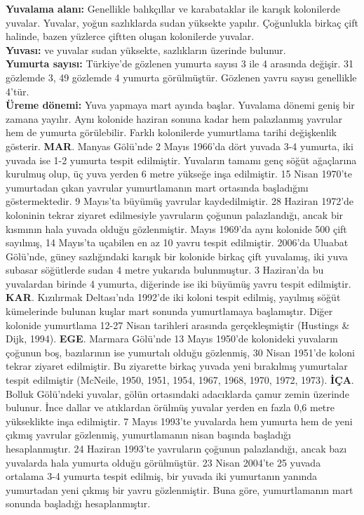 \documentclass[
  a4paper,
  DIV=11,
  numbers=noendperiod]{scrreprt}
\begin{document}
\textbf{Yuvalama alanı:} Genellikle balıkçıllar ve karabataklar ile
karışık kolonilerde yuvalar. Yuvalar, yoğun sazlıklarda sudan yüksekte
yapılır. Çoğunlukla birkaç çift halinde, bazen yüzlerce çiftten oluşan
kolonilerde yuvalar.\\
\textbf{Yuvası:} ve yuvalar sudan yüksekte, sazlıkların üzerinde
bulunur.\\
\textbf{Yumurta sayısı:} Türkiye'de gözlenen yumurta sayısı 3 ile 4
arasında değişir. 31 gözlemde 3, 49 gözlemde 4 yumurta görülmüştür.
Gözlenen yavru sayısı genellikle 4'tür.\\
\textbf{Üreme dönemi:} Yuva yapmaya mart ayında başlar. Yuvalama dönemi
geniş bir zamana yayılır. Aynı kolonide haziran sonuna kadar hem
palazlanmış yavrular hem de yumurta görülebilir. Farklı kolonilerde
yumurtlama tarihi değişkenlik gösterir. \textbf{MAR}. Manyas Gölü'nde 2
Mayıs 1966'da dört yuvada 3-4 yumurta, iki yuvada ise 1-2 yumurta tespit
edilmiştir. Yuvaların tamamı genç söğüt ağaçlarına kurulmuş olup, üç
yuva yerden 6 metre yükseğe inşa edilmiştir. 15 Nisan 1970'te yumurtadan
çıkan yavrular yumurtlamanın mart ortasında başladığını göstermektedir.
9 Mayıs'ta büyümüş yavrular kaydedilmiştir. 28 Haziran 1972'de koloninin
tekrar ziyaret edilmesiyle yavruların çoğunun palazlandığı, ancak bir
kısmının hala yuvada olduğu gözlenmiştir. Mayıs 1969'da aynı kolonide
500 çift sayılmış, 14 Mayıs'ta uçabilen en az 10 yavru tespit
edilmiştir. 2006'da Uluabat Gölü'nde, güney sazlığındaki karışık bir
kolonide birkaç çift yuvalamış, iki yuva subasar söğütlerde sudan 4
metre yukarıda bulunmuştur. 3 Haziran'da bu yuvalardan birinde 4
yumurta, diğerinde ise iki büyümüş yavru tespit edilmiştir.
\textbf{KAR}. Kızılırmak Deltası'nda 1992'de iki koloni tespit edilmiş,
yayılmış söğüt kümelerinde bulunan kuşlar mart sonunda yumurtlamaya
başlamıştır. Diğer kolonide yumurtlama 12-27 Nisan tarihleri arasında
gerçekleşmiştir (Hustings \& Dijk, 1994). \textbf{EGE}. Marmara Gölü'nde
13 Mayıs 1950'de kolonideki yuvaların çoğunun boş, bazılarının ise
yumurtalı olduğu gözlenmiş, 30 Nisan 1951'de koloni tekrar ziyaret
edilmiştir. Bu ziyarette birkaç yuvada yeni bırakılmış yumurtalar tespit
edilmiştir (McNeile, 1950, 1951, 1954, 1967, 1968, 1970, 1972, 1973).
\textbf{İÇA}. Bolluk Gölü'ndeki yuvalar, gölün ortasındaki adacıklarda
çamur zemin üzerinde bulunur. İnce dallar ve atıklardan örülmüş yuvalar
yerden en fazla 0,6 metre yükseklikte inşa edilmiştir. 7 Mayıs 1993'te
yuvalarda hem yumurta hem de yeni çıkmış yavrular gözlenmiş,
yumurtlamanın nisan başında başladığı hesaplanmıştır. 24 Haziran 1993'te
yavruların çoğunun palazlandığı, ancak bazı yuvalarda hala yumurta
olduğu görülmüştür. 23 Nisan 2004'te 25 yuvada ortalama 3-4 yumurta
tespit edilmiş, bir yuvada iki yumurtanın yanında yumurtadan yeni çıkmış
bir yavru gözlenmiştir. Buna göre, yumurtlamanın mart sonunda başladığı
hesaplanmıştır.
\end{document}
